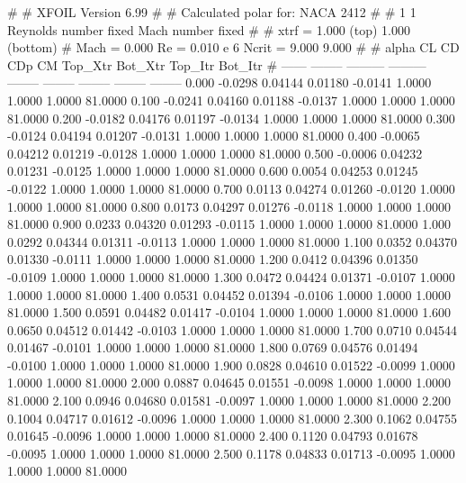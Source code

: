 #  
#       XFOIL         Version 6.99
#  
# Calculated polar for: NACA 2412                                       
#  
# 1 1 Reynolds number fixed          Mach number fixed         
#  
# xtrf =   1.000 (top)        1.000 (bottom)  
# Mach =   0.000     Re =     0.010 e 6     Ncrit =   9.000  9.000
#  
#   alpha    CL        CD       CDp       CM     Top_Xtr  Bot_Xtr  Top_Itr  Bot_Itr
#  ------ -------- --------- --------- -------- -------- -------- -------- --------
   0.000  -0.0298   0.04144   0.01180  -0.0141   1.0000   1.0000   1.0000  81.0000
   0.100  -0.0241   0.04160   0.01188  -0.0137   1.0000   1.0000   1.0000  81.0000
   0.200  -0.0182   0.04176   0.01197  -0.0134   1.0000   1.0000   1.0000  81.0000
   0.300  -0.0124   0.04194   0.01207  -0.0131   1.0000   1.0000   1.0000  81.0000
   0.400  -0.0065   0.04212   0.01219  -0.0128   1.0000   1.0000   1.0000  81.0000
   0.500  -0.0006   0.04232   0.01231  -0.0125   1.0000   1.0000   1.0000  81.0000
   0.600   0.0054   0.04253   0.01245  -0.0122   1.0000   1.0000   1.0000  81.0000
   0.700   0.0113   0.04274   0.01260  -0.0120   1.0000   1.0000   1.0000  81.0000
   0.800   0.0173   0.04297   0.01276  -0.0118   1.0000   1.0000   1.0000  81.0000
   0.900   0.0233   0.04320   0.01293  -0.0115   1.0000   1.0000   1.0000  81.0000
   1.000   0.0292   0.04344   0.01311  -0.0113   1.0000   1.0000   1.0000  81.0000
   1.100   0.0352   0.04370   0.01330  -0.0111   1.0000   1.0000   1.0000  81.0000
   1.200   0.0412   0.04396   0.01350  -0.0109   1.0000   1.0000   1.0000  81.0000
   1.300   0.0472   0.04424   0.01371  -0.0107   1.0000   1.0000   1.0000  81.0000
   1.400   0.0531   0.04452   0.01394  -0.0106   1.0000   1.0000   1.0000  81.0000
   1.500   0.0591   0.04482   0.01417  -0.0104   1.0000   1.0000   1.0000  81.0000
   1.600   0.0650   0.04512   0.01442  -0.0103   1.0000   1.0000   1.0000  81.0000
   1.700   0.0710   0.04544   0.01467  -0.0101   1.0000   1.0000   1.0000  81.0000
   1.800   0.0769   0.04576   0.01494  -0.0100   1.0000   1.0000   1.0000  81.0000
   1.900   0.0828   0.04610   0.01522  -0.0099   1.0000   1.0000   1.0000  81.0000
   2.000   0.0887   0.04645   0.01551  -0.0098   1.0000   1.0000   1.0000  81.0000
   2.100   0.0946   0.04680   0.01581  -0.0097   1.0000   1.0000   1.0000  81.0000
   2.200   0.1004   0.04717   0.01612  -0.0096   1.0000   1.0000   1.0000  81.0000
   2.300   0.1062   0.04755   0.01645  -0.0096   1.0000   1.0000   1.0000  81.0000
   2.400   0.1120   0.04793   0.01678  -0.0095   1.0000   1.0000   1.0000  81.0000
   2.500   0.1178   0.04833   0.01713  -0.0095   1.0000   1.0000   1.0000  81.0000
